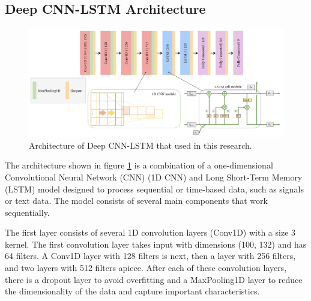 \subsection{Deep CNN-LSTM Architecture}

\begin{figure}[h!]
	\centering
	\includegraphics[width=\linewidth]{bab3/ar_DeepCNNLSTMArch.png}
	\caption{Architecture of Deep CNN-LSTM that used in this research.}
	\label{fig:DeepCNNLSTMArch}
\end{figure}

The architecture shown in figure \ref{fig:DeepCNNLSTMArch} is a combination of a one-dimensional Convolutional Neural Network (CNN) (1D CNN) and Long Short-Term Memory (LSTM) model designed to process sequential or time-based data, such as signals or text data. The model consists of several main components that work sequentially.

The first layer consists of several 1D convolution layers (Conv1D) with a size 3 kernel. The first convolution layer takes input with dimensions (100, 132) and has 64 filters. A Conv1D layer with 128 filters is next, then a layer with 256 filters, and two layers with 512 filters apiece. After each of these convolution layers, there is a dropout layer to avoid overfitting and a MaxPooling1D layer to reduce the dimensionality of the data and capture important characteristics.


